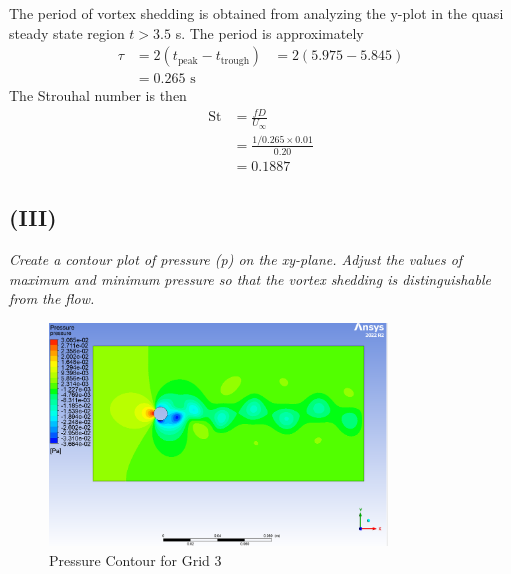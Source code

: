 The period of vortex shedding is obtained from analyzing the y-plot in the quasi steady state region $t > 3.5$ s. The period is approximately
\begin{align*}
    \tau &= 2(t_{\text{peak}} - t_{\text{trough}})
    &= 2(5.975 - 5.845) \\
    &= \boxed{0.265} \text{ s}
\end{align*}
The Strouhal number is then
\begin{align*}
    \text{St} &= \frac{fD}{U_\infty} \\
    &= \frac{1/0.265 \times 0.01}{0.20} \\ 
    &= \boxed{0.1887}
\end{align*}

\subsection{(III)}
\textit{Create a contour plot of pressure (p) on the xy-plane. Adjust the values of maximum and minimum pressure so that the vortex shedding is distinguishable from the flow.}
\begin{figure}[H]
    \centering
    \includegraphics[width=0.8\textwidth]{Questions/Figures/pressure contour grid 3.png}
    \caption{Pressure Contour for Grid 3}
    \label{fig:pressure contour grid 3}
\end{figure}

